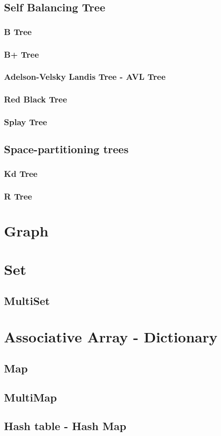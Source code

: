 \section{Self Balancing Tree}
\subsection{B Tree}
\subsection{B+ Tree}

\subsection{Adelson-Velsky Landis Tree - AVL Tree}
\subsection{Red Black Tree}
\subsection{Splay Tree}


\section{Space-partitioning trees}
\subsection{Kd Tree}
\subsection{R Tree}

\chapter{Graph}

\chapter{Set}
\section{MultiSet}

\chapter{Associative Array - Dictionary}
\section{Map}
\section{MultiMap}
\section{Hash table - Hash Map}
\iffalse
http://www.tommyds.it/doc/benchmark.html
\fi